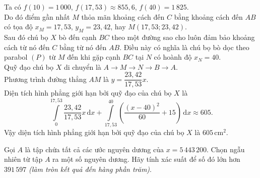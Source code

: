 \begin{ex}
{		Ta có $f(10)=1\,000$, $f(17{,}53)\approx 855{,}6$, $f(40)=1\,825$.\\
		Do đó điểm gần nhất $M$ thỏa mãn khoảng cách đến $C$ bằng khoảng cách đến $AB$ có tọa độ $x_M=17{,}53$, $y_M=23{,}42$, hay $M\left(17{,}53; 23{,}42\right)$. \\
		Sau đó chú bọ $X$ bò đến cạnh $BC$ theo một đường sao cho luôn đảm bảo khoảng cách từ nó đến $C$ bằng từ nó đến $AB$. Điều này có nghĩa là chú bọ bò dọc theo parabol $(P)$ từ $M$ đến khi gặp cạnh $BC$ tại $N$ có hoành độ $x_N=40$.\\
		Quỹ đạo chú bọ $X$ di chuyển là $A\to M\to N\to B\to A$.\\
		Phương trình đường thẳng $AM$ là $y=\dfrac{23{,}42}{17{,}53}x$.\\
		Diện tích hình phẳng giới hạn bởi quỹ đạo của chú bọ $X$ là
		\[
		\displaystyle\int\limits_{0}^{17{,}53} \dfrac{23{,}42}{17{,}53}x \,\mathrm{d}x+
		\displaystyle\int\limits_{17{,}53}^{40} \left(\dfrac{(x-40)^2}{60}+15\right) \,\mathrm{d}x\approx 605.
		\]
		Vậy diện tích hình phẳng giới hạn bởi quỹ đạo của chú bọ $X$ là $605\mathrm{\,cm}^2$.
	}
\end{ex}

\begin{ex}%
	Gọi $A$ là tập chứa tất cả các ước nguyên dương của $x=5\,443\,200$. Chọn ngẫu nhiên từ tập $A$ ra một số nguyên dương. Hãy tính xác suất để số đó lớn hơn $391\,597$ \textit{(làm tròn kết quả đến hàng phần trăm)}.
	\par 
\end{ex}

